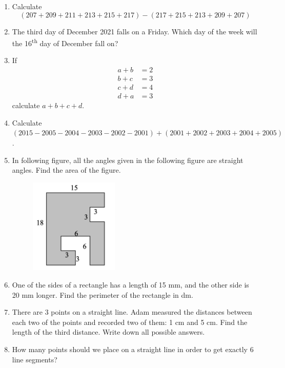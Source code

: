 \documentclass[11pt]{scrartcl}
\begin{document}
\begin{enumerate}
\item Calculate
    \[ (207 + 209 + 211 + 213 + 215 + 217) - (217 + 215 + 213 + 209 + 207) \]

\item The third day of December 2021 falls on a Friday. Which day of the week will the 16\textsuperscript{th} day of December fall on?

\item If
\begin{align*}
    a+b &= 2\\
    b+c &= 3\\
    c+d &= 4\\
    d+a &= 3
\end{align*}
calculate $a+b+c+d$.

\item Calculate $(2015 - 2005 - 2004 - 2003 - 2002 - 2001) + (2001 + 2002 + 2003 + 2004 + 2005)$.

\item In following figure, all the angles given in the following figure are straight angles. Find the area of the figure.
    \begin{figure}[h]
        \centering
        \includegraphics[width=0.4\textwidth]{StarGen/0Figure/nazi-area.png}
    \end{figure}

\item One of the sides of a rectangle has a length of 15 mm, and the other side is 20 mm longer. Find the perimeter of the rectangle in dm.

\item There are 3 points on a straight line. Adam measured the distances between each two of the points and recorded two of them: 1 cm and 5 cm. Find the length of the third distance. Write down all possible answers.

\item How many points should we place on a straight line in order to get exactly 6 line segments?


\end{enumerate}
\end{document}
